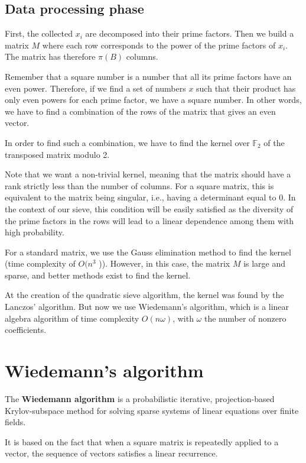 \documentclass[a4paper, 11pt]{article}
\begin{document}
\subsection{Data processing phase}
First, the collected $x_i$ are decomposed into their prime factors. Then we build a
matrix $M$ where each row corresponds to the power of the prime factors of $x_i$.
The matrix has therefore $\pi(B)$ columns.

Remember that a square number is a number that all its prime factors have an
even power. Therefore, if we find a set of numbers $x$ such that their product has
only even powers for each prime factor, we have a square number. In other words, we
have to find a combination of the rows of the matrix that gives an even vector.

In order to find such a combination, we have to find the kernel over $\mathbb{F}_2$ of the transposed matrix modulo 2.

Note that we want a non-trivial kernel, meaning that the matrix should have a rank strictly less than the number of columns. For a square matrix, this is equivalent to the matrix being singular, i.e., having a determinant equal to 0. In the context of our sieve, this condition will be easily satisfied as the diversity of the prime factors in the rows will lead to a linear dependence among them with high probability.

For a standard matrix, we use the Gauss elimination method to find the kernel
(time complexity of $O(n^3$ )).
However, in this case, the matrix $M$ is large and sparse, and better methods
exist to find the kernel.

At the creation of the quadratic sieve algorithm, the kernel was found by the
Lanczos' algorithm. But now we use Wiedemann's algorithm, which is a linear
algebra algorithm of time complexity $O(n\omega)$, with $\omega$ the number of
nonzero coefficients.

\newpage

\section{Wiedemann's algorithm}
The \textbf{Wiedemann algorithm} \cite{wiedemann} is a probabilistic iterative, projection-based Krylov-subspace method for solving sparse systems of linear equations over finite fields. 

It is based on the fact that when a square matrix is repeatedly applied to a
vector, the sequence of vectors satisfies a linear recurrence.
\end{document}
